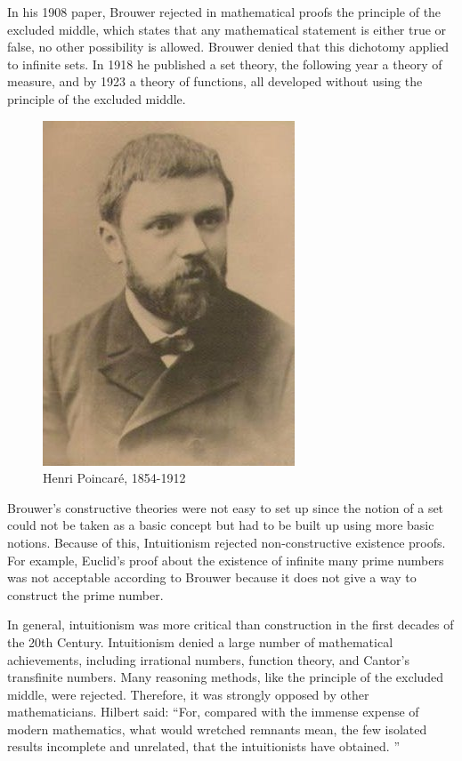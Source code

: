 \documentclass{article}
\begin{document}
In his 1908 paper, Brouwer rejected in mathematical proofs the principle of the excluded middle, which states that any mathematical statement is either true or false, no other possibility is allowed. Brouwer denied that this dichotomy applied to infinite sets. In 1918 he published a set theory, the following year a theory of measure, and by 1923 a theory of functions, all developed without using the principle of the excluded middle.

\begin{figure}
 \centering
 \includegraphics[scale=0.4]{img/Poincare.jpg}
 \captionsetup{labelformat=empty}
 \caption{Henri Poincaré, 1854-1912}
 \label{fig:Poincare}
\end{figure}

Brouwer's constructive theories were not easy to set up since the notion of a set could not be taken as a basic concept but had to be built up using more basic notions. Because of this, Intuitionism rejected non-constructive existence proofs. For example, Euclid's proof about the existence of infinite many prime numbers was not acceptable according to Brouwer because it does not give a way to construct the prime number.

In general, intuitionism was more critical than construction in the first decades of the 20th Century. Intuitionism denied a large number of mathematical achievements, including irrational numbers, function theory, and Cantor's transfinite numbers. Many reasoning methods, like the principle of the excluded middle, were rejected. Therefore, it was strongly opposed by other mathematicians. Hilbert said: ``For, compared with the immense expense of modern mathematics, what would wretched remnants mean, the few isolated results incomplete and unrelated, that the intuitionists have obtained. ''
\end{document}
